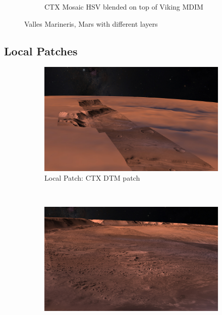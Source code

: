 \begin{figure}[h]
\begin{subfigure}[bt]{0.90\textwidth}
        \caption{CTX Mosaic HSV blended on top of Viking MDIM}
    \end{subfigure}
    \caption{Valles Marineris, Mars with different layers}
    \label{fig:hsvblending}
\end{figure}

\clearpage
\subsection{Local Patches}
\label{section:localpatchesresult}
\FloatBarrier

\begin{figure}[h]
    \centering
    \begin{subfigure}[t]{0.45\textwidth}
        \includegraphics[width=\textwidth]{figures/results/screenshots_thesis_old/west_candor_chasma1.jpg}
        \caption{Local Patch: CTX DTM patch}
    \end{subfigure}
    ~
    \begin{subfigure}[t]{0.45\textwidth}
        \includegraphics[width=\textwidth]{figures/results/screenshots_thesis_old/west_candor_chasma2.jpg}

\end{subfigure}
\end{figure}
